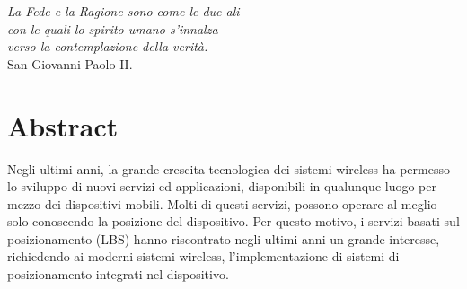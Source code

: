 \thispagestyle{empty}
\vspace*{15ex}
\begin{flushright}
\textit{La Fede e la Ragione sono come le due ali \\
con le quali lo spirito umano s'innalza \\
verso la contemplazione della verit\`a.\\}
\vspace{4ex}
\scriptsize{San Giovanni Paolo II.}
\end{flushright}
\cleardoublepage

\chapter*{Abstract}
\label{chap:abstract}
Negli ultimi anni, la grande crescita tecnologica dei sistemi wireless ha permesso lo sviluppo di nuovi
servizi ed applicazioni, disponibili in qualunque luogo per mezzo dei dispositivi mobili.
Molti di questi servizi, possono operare al meglio solo conoscendo la posizione del dispositivo.
Per questo motivo, i servizi basati sul posizionamento (LBS) hanno riscontrato negli ultimi anni un 
grande interesse, richiedendo ai moderni sistemi wireless, l'implementazione di sistemi di posizionamento
integrati nel dispositivo. 